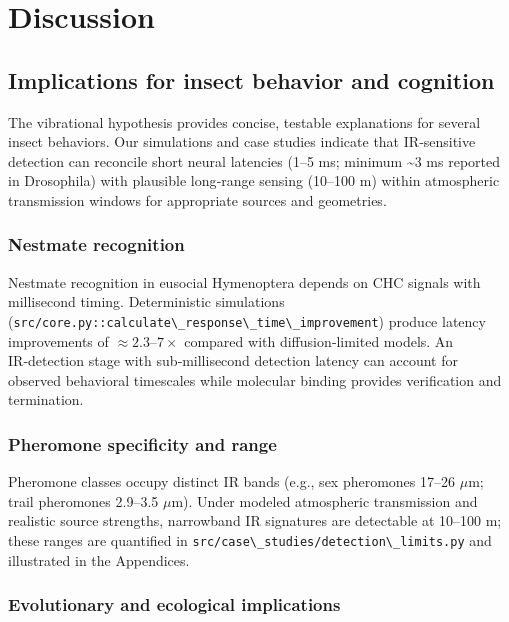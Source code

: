 \documentclass[
  13pt,
  a4paperpaper,
  12pt]{article}
\author{}
\date{}
\newcommand{\passthrough}[1]{#1}
\let\oldsection\section
\renewcommand{\section}{\clearpage\oldsection}
\begin{document}
{
\hypersetup{linkcolor=black}
\setcounter{tocdepth}{3}
\tableofcontents
}
\section{Discussion}\label{sec:discussion}

\subsection{Implications for insect behavior and
cognition}\label{implications-for-insect-behavior-and-cognition}

The vibrational hypothesis provides concise, testable explanations for
several insect behaviors. Our simulations and case studies indicate that
IR‑sensitive detection can reconcile short neural latencies (1--5 ms;
minimum \textasciitilde3 ms reported in Drosophila) with plausible
long‑range sensing (10--100 m) within atmospheric transmission windows
for appropriate sources and geometries.

\subsubsection{Nestmate recognition}\label{nestmate-recognition}

Nestmate recognition in eusocial Hymenoptera depends on CHC signals with
millisecond timing. Deterministic simulations
(\passthrough{\lstinline!src/core.py::calculate\_response\_time\_improvement!})
produce latency improvements of \(\approx 2.3\text{--}7\times\) compared
with diffusion‑limited models. An IR‑detection stage with
sub‑millisecond detection latency can account for observed behavioral
timescales while molecular binding provides verification and
termination.

\subsubsection{Pheromone specificity and
range}\label{pheromone-specificity-and-range}

Pheromone classes occupy distinct IR bands (e.g., sex pheromones 17--26
\(\mu\mathrm{m}\); trail pheromones 2.9--3.5 \(\mu\mathrm{m}\)). Under
modeled atmospheric transmission and realistic source strengths,
narrowband IR signatures are detectable at 10--100 m; these ranges are
quantified in
\passthrough{\lstinline!src/case\_studies/detection\_limits.py!} and
illustrated in the Appendices.

\subsubsection{Evolutionary and ecological
implications}\label{evolutionary-and-ecological-implications}
\end{document}
